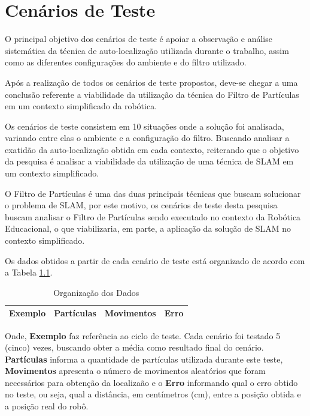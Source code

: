 \chapter[Cenários de Teste]{Cenários de Teste}
\label{sec:cenarios_teste}
O principal objetivo dos cenários de teste é apoiar a observação e análise sistemática da técnica de auto-localização utilizada durante o trabalho, assim como as diferentes configurações do ambiente e
do filtro utilizado.

Após a realização de todos os cenários de teste propostos, deve-se chegar a uma conclusão referente a viabilidade da utilização da técnica do Filtro de Partículas em um contexto simplificado da robótica.

Os cenários de teste consistem em 10 situações onde a solução foi analisada, variando entre elas o ambiente e a configuração do filtro. Buscando
analisar a exatidão da auto-localização obtida em cada contexto, reiterando que o objetivo da pesquisa é analisar a viabilidade da utilização
de uma técnica de SLAM em um contexto simplificado.

O Filtro de Partículas é uma das duas principais técnicas que buscam solucionar o problema
de SLAM, por este motivo, os cenários de teste desta pesquisa buscam analisar o Filtro de Partículas sendo executado no contexto da Robótica
Educacional, o que viabilizaria, em parte, a aplicação da solução de SLAM no contexto simplificado.

Os dados obtidos a partir de cada cenário de teste está organizado de acordo com a Tabela \ref{tab:org_dados}.

\begin{table}[H]
  \centering
  \caption{Organização dos Dados}
  \label{tab:org_dados}
  \begin{tabular}{|c|c|c|c|}
  \hline
  \textbf{Exemplo} & \textbf{Partículas} & \textbf{Movimentos} & \textbf{Erro} \\ \hline
  \end{tabular}
\end{table}

Onde, \textbf{Exemplo} faz referência ao ciclo de teste. Cada cenário foi testado 5 (cinco) vezes, buscando obter a média como resultado
final do cenário. \textbf{Partículas} informa a quantidade de partículas utilizada durante este teste, \textbf{Movimentos} apresenta
o número de movimentos aleatórios que foram necessários para obtenção da localizaão e o \textbf{Erro} informando qual o erro obtido no teste, ou seja,
qual a distância, em centímetros (cm), entre a posição obtida e a posição real do robô.

